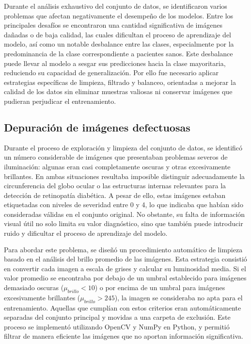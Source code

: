 Durante el análisis exhaustivo del conjunto de datos, se identificaron varios problemas 
que afectan negativamente el desempeño de los modelos. Entre los principales desafíos se 
encontraron una cantidad significativa de imágenes dañadas o de baja calidad, las cuales 
dificultan el proceso de aprendizaje del modelo, así como un notable desbalance entre las 
clases, especialmente por la predominancia de la clase correspondiente a pacientes sanos. 
Este desbalance puede llevar al modelo a sesgar sus predicciones hacia la clase 
mayoritaria, reduciendo su capacidad de generalización. Por ello fue necesario aplicar 
estrategias específicas de limpieza, filtrado y balanceo, orientadas a mejorar la calidad 
de los datos sin eliminar muestras valiosas ni conservar imágenes que pudieran perjudicar 
el entrenamiento.

\subsection{Depuración de imágenes defectuosas} \label{subsec:depuracion-imagenes}

Durante el proceso de exploración y limpieza del conjunto de datos, se identificó un 
número considerable de imágenes que presentaban problemas severos de iluminación: algunas 
eran casi completamente oscuras y otras excesivamente brillantes. En ambas situaciones 
resultaba imposible distinguir adecuadamente la circunferencia del globo ocular o las 
estructuras internas relevantes para la detección de retinopatía diabética. A pesar de 
ello, estas imágenes estaban etiquetadas con niveles de severidad entre 0 y 4, lo que 
indicaba que habían sido consideradas válidas en el conjunto original. No obstante, su 
falta de información visual útil no solo limita su valor diagnóstico, sino que también 
puede introducir ruido y dificultar el proceso de aprendizaje del modelo.

Para abordar este problema, se diseñó un procedimiento automático de limpieza basado en 
el análisis del brillo promedio de las imágenes. Esta estrategia consistió en convertir 
cada imagen a escala de grises y calcular su luminosidad media. Si el valor promedio se 
encontraba por debajo de un umbral establecido para imágenes demasiado oscuras 
($\mu_{brillo} < 10$) o por encima de un umbral para imágenes excesivamente brillantes 
($\mu_{brillo} > 245$), la imagen se consideraba no apta para el entrenamiento. Aquellas 
que cumplían con estos criterios eran automáticamente separadas del conjunto principal y 
movidas a una carpeta de exclusión. Este proceso se implementó utilizando OpenCV y NumPy 
en Python, y permitió filtrar de manera eficiente las imágenes que no aportan información 
significativa.

